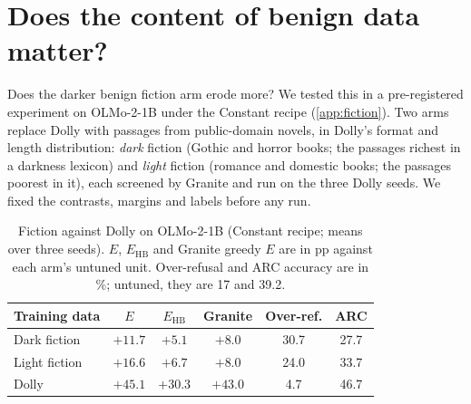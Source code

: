 \documentclass{article}
\newcommand{\Ehb}{E_{\mathrm{HB}}}
\begin{document}
\section{Does the content of benign data matter?}
\label{sec:fiction}

Does the darker benign fiction arm erode more? We tested this in a
pre-registered experiment on OLMo-2-1B under the
Constant recipe (\cref{app:fiction}). Two arms replace Dolly with passages
from public-domain novels, in Dolly's format and length distribution:
\emph{dark} fiction (Gothic and horror books; the passages richest in a
darkness lexicon) and \emph{light} fiction (romance and domestic books; the
passages poorest in it), each screened by Granite and run on the three Dolly
seeds. We fixed the contrasts, margins and labels before any run.

\begin{table}[t]
  \caption{Fiction against Dolly on OLMo-2-1B (Constant recipe; means over
    three seeds). $E$, $\Ehb$ and Granite greedy $E$ are in pp against each
    arm's untuned unit. Over-refusal and ARC accuracy are in \%; untuned, they
    are 17 and 39.2.}
  \label{tab:fiction}
  \centering
  \small
  \setlength{\tabcolsep}{4pt}
  \begin{tabular}{@{}l c c c c c@{}}
    \toprule
    Training data & $E$ & $\Ehb$ & Granite & Over-ref. & ARC \\
    \midrule
    Dark fiction & $+11.7$ & $+5.1$ & $+8.0$ & 30.7 & 27.7 \\
    Light fiction & $+16.6$ & $+6.7$ & $+8.0$ & 24.0 & 33.7 \\
    Dolly & $+45.1$ & $+30.3$ & $+43.0$ & 4.7 & 46.7 \\
    \bottomrule
  \end{tabular}
\end{table}
\end{document}
